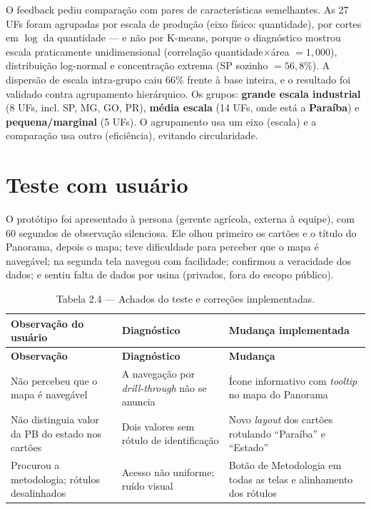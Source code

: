 \documentclass[11pt,a4paper]{article}
\begin{document}
O feedback pediu comparação com pares de características semelhantes. As 27 UFs foram agrupadas por
escala de produção (eixo físico: quantidade), por cortes em $\log$ da quantidade — e não por
K-means, porque o diagnóstico mostrou escala praticamente unidimensional (correlação
quantidade$\times$área $= 1{,}000$), distribuição log-normal e concentração extrema (SP sozinho
$=56{,}8\%$). A dispersão de escala intra-grupo caiu 66\% frente à base inteira, e o resultado foi
validado contra agrupamento hierárquico. Os grupos: \textbf{grande escala industrial} (8 UFs,
incl. SP, MG, GO, PR), \textbf{média escala} (14 UFs, onde está a \textbf{Paraíba}) e
\textbf{pequena/marginal} (5 UFs). O agrupamento usa um eixo (escala) e a comparação usa outro
(eficiência), evitando circularidade.

\section{Teste com usuário}

O protótipo foi apresentado à persona (gerente agrícola, externa à equipe), com 60 segundos de
observação silenciosa. Ele olhou primeiro os cartões e o título do Panorama, depois o mapa; teve
dificuldade para perceber que o mapa é navegável; na segunda tela navegou com facilidade;
confirmou a veracidade dos dados; e sentiu falta de dados por usina (privados, fora do escopo
público).

\begin{longtable}{L{4.8cm} L{4.6cm} L{4.6cm}}
\caption{Tabela 2.4 — Achados do teste e correções implementadas.}\\
\toprule
\textbf{Observação do usuário} & \textbf{Diagnóstico} & \textbf{Mudança implementada}\\
\midrule
\endfirsthead
\toprule
\textbf{Observação} & \textbf{Diagnóstico} & \textbf{Mudança}\\
\midrule
\endhead
\bottomrule
\endfoot
Não percebeu que o mapa é navegável & A navegação por \textit{drill-through} não se anuncia & Ícone informativo com \textit{tooltip} no mapa do Panorama\\
\addlinespace
Não distinguia valor da PB do estado nos cartões & Dois valores sem rótulo de identificação & Novo \textit{layout} dos cartões rotulando ``Paraíba'' e ``Estado''\\
\addlinespace
Procurou a metodologia; rótulos desalinhados & Acesso não uniforme; ruído visual & Botão de Metodologia em todas as telas e alinhamento dos rótulos\\
\end{longtable}
\end{document}
